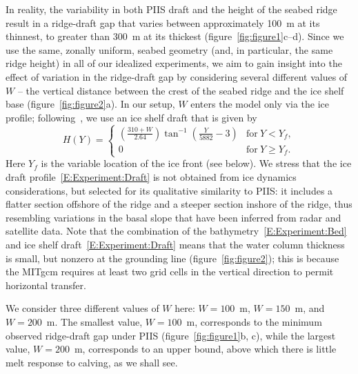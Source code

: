 \documentclass[draft]{agujournal2019}
\begin{document}
In reality, the variability in both PIIS draft and the height of the seabed ridge result in a ridge-draft gap that varies between approximately 100 m at its thinnest, to greater than 300 m at its thickest (figure~\ref{fig:figure1}c--d). Since we use the same, zonally uniform, seabed geometry (and, in particular, the same ridge height) in all of our idealized experiments, we aim to gain insight into the effect of variation in the ridge-draft gap by considering several different values of $W$ -- the vertical distance between the crest of the seabed ridge and the ice shelf base (figure~\ref{fig:figure2}a). In our setup, $W$ enters the model only via the ice profile; following~, we use an ice shelf draft that is given by
\begin{equation}\label{E:Experiment:Draft}
    H(Y) = \begin{cases}
    \left(\frac{310 + W}{2.64}\right)\tan^{-1}\left(\frac{Y}{5882} -3\right) & \text{for}~Y < Y_f,\\
    0  & \text{for}~Y \geq Y_f.
    \end{cases}
\end{equation}
Here $Y_f$ is the variable location of the ice front (see below). We stress that the ice draft profile~\eqref{E:Experiment:Draft} is not obtained from ice dynamics considerations, but selected for its qualitative similarity to PIIS: it includes a flatter section offshore of the ridge and a steeper section inshore of the ridge, thus resembling variations in the basal slope that have been inferred from radar and satellite data. Note that the combination of the bathymetry~\eqref{E:Experiment:Bed} and ice shelf draft~\eqref{E:Experiment:Draft} means that the water column thickness is small, but nonzero at the grounding line (figure~\ref{fig:figure2}); this is because the MITgcm requires at least two grid cells in the vertical direction to permit horizontal transfer.

We consider three different values of $W$ here: $W=100$~m, $W=150$~m, and $W=200$~m. The smallest value, $W=100$~m, corresponds to the minimum observed ridge-draft gap under PIIS (figure~\ref{fig:figure1}b, c), while the largest value, $W=200$~m, corresponds to an upper bound, above which there is little melt response to calving, as we shall see.
\end{document}
